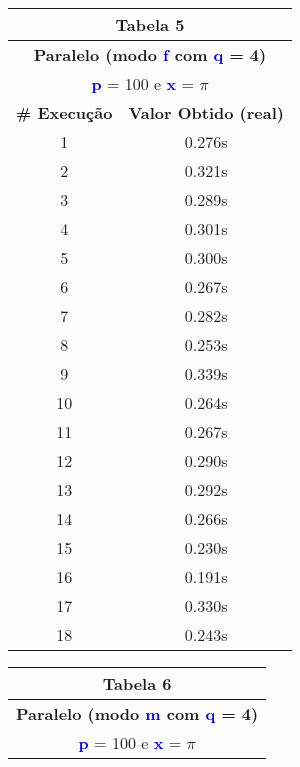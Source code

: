 \documentclass[11pt]{article}
\begin{document}
\begin{table}[!h]
	\begin{center}
		\begin{minipage}{0.48\textwidth}
			\begin{tabular}{| c | c |}
			\hline
			\multicolumn{2}{|c|}{\textbf{Tabela 5}} \\ \hline
			\multicolumn{2}{|c|}{\textbf{Paralelo (modo \textbf{\textcolor{blue}{f}} com \textbf{\textcolor{blue}{q}} = 4)}} \\
			\multicolumn{2}{|c|}{\textbf{\textcolor{blue}{p}} = 100 e \textbf{\textcolor{blue}{x}} = $\pi$} \\ [0.2ex]
			\hline
				\textbf{\# Execução} &  \textbf{Valor Obtido (real)} \\ \hline
				1 & 0.276s \\ \hline
				2 & 0.321s \\ \hline
				3 & 0.289s \\ \hline
				4 & 0.301s \\ \hline
				5 & 0.300s \\ \hline
				6 & 0.267s \\ \hline
				7 & 0.282s \\ \hline
				8 & 0.253s \\ \hline
				9 & 0.339s \\ \hline
				10 & 0.264s \\ \hline
				11 & 0.267s \\ \hline
				12 & 0.290s \\ \hline
				13 & 0.292s \\ \hline
				14 & 0.266s \\ \hline
				15 & 0.230s \\ \hline
				16 & 0.191s \\ \hline
				17 & 0.330s \\ \hline
				18 & 0.243s \\ \hline
			\end{tabular}
		\end{minipage}
		\begin{minipage}{0.48\textwidth}
			\begin{tabular}{| c | c |}
			\hline
			\multicolumn{2}{|c|}{\textbf{Tabela 6}} \\ \hline
			\multicolumn{2}{|c|}{\textbf{Paralelo (modo \textbf{\textcolor{blue}{m}} com \textbf{\textcolor{blue}{q}} = 4)}} \\
			\multicolumn{2}{|c|}{\textbf{\textcolor{blue}{p}} = 100 e \textbf{\textcolor{blue}{x}} = $\pi$} \\ [0.2ex]

\end{tabular}
\end{minipage}
\end{center}
\end{table}
\end{document}
